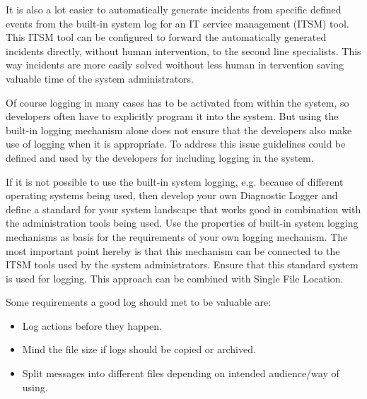 It is also a lot easier to automatically generate incidents from specific defined events from the built-in system log for an IT service management (ITSM) tool. This ITSM tool can be configured to forward the automatically generated incidents directly, without human intervention, to the second line specialists. This way incidents are more easily solved woithout less human in tervention saving valuable time of the system administrators.

Of course logging in many cases has to be activated from within the system, so developers often have to explicitly program it into the system. But using the built-in logging mechanism alone does not ensure that the developers also make use of logging when it is appropriate. To address this issue guidelines could be defined and used by the developers for including logging in the system. 

If it is not possible to use the built-in system logging, e.g. because of different operating systems being used, then develop your own {\sc Diagnostic Logger} \cite{Harrison2001} and define a standard for your system landscape that works good in combination with the administration tools being used. Use the properties of built-in system logging mechanisms as basis for the requirements of your own logging mechanism. The most important point hereby is that this mechanism can be connected to the ITSM tools used by the system administrators. Ensure that this standard system is used for logging. This approach can be combined with {\sc Single File Location}.

Some requirements a good log should met to be valuable are:
\begin{itemize}
	\item Log actions before they happen.
	\item Mind the file size if logs should be copied or archived.
	\item Split messages into different files depending on intended audience/way of using.
\end{itemize}



%






